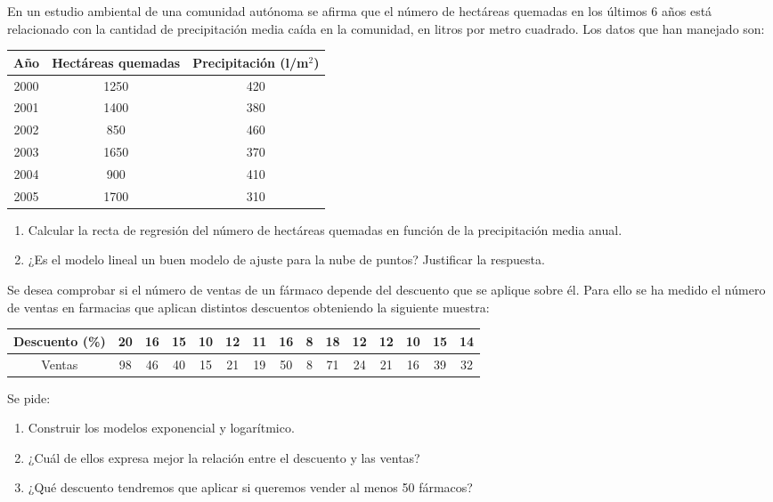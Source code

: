 {En un estudio ambiental de una comunidad autónoma se afirma que el número de hectáreas quemadas en los últimos 6 años está relacionado con la cantidad de precipitación media caída en la comunidad, en litros por metro cuadrado. Los datos que han manejado son:
\begin{center}
\begin{tabular}{|l|l|l|}
\hline
\multicolumn{1}{|c|}{Año} & \multicolumn{1}{c|}{Hectáreas quemadas} & \multicolumn{1}{c|}{Precipitación (l/m$^2$)} \\
\hline
\multicolumn{1}{|c|}{2000} & \multicolumn{1}{c|}{1250} & \multicolumn{1}{c|}{420} \\
\hline
\multicolumn{1}{|c|}{2001} & \multicolumn{1}{c|}{1400} & \multicolumn{1}{c|}{380} \\
\hline
\multicolumn{1}{|c|}{2002} & \multicolumn{1}{c|}{850} & \multicolumn{1}{c|}{460} \\
\hline
\multicolumn{1}{|c|}{2003} & \multicolumn{1}{c|}{1650} & \multicolumn{1}{c|}{370} \\
\hline
\multicolumn{1}{|c|}{2004} & \multicolumn{1}{c|}{900} & \multicolumn{1}{c|}{410} \\
\hline
\multicolumn{1}{|c|}{2005} & \multicolumn{1}{c|}{1700} & \multicolumn{1}{c|}{310} \\
\hline
\end{tabular}
\end{center}

\begin{enumerate}
\item Calcular la recta de regresión del número de hectáreas quemadas en función de la precipitación media anual.
\item ¿Es el modelo lineal un buen modelo de ajuste para la nube de puntos? Justificar la respuesta.
\end{enumerate}
}
{}
{}


{Se desea comprobar si el número de ventas de un fármaco depende del descuento que se aplique sobre él.
Para ello se ha medido el número de ventas en farmacias que aplican distintos descuentos obteniendo la siguiente muestra:
\begin{center}
\begin{tabular}{|c||c|c|c|c|c|c|c|c|c|c|c|c|c|c|}
\hline Descuento (\%) & 20 & 16 & 15 & 10 & 12 & 11 & 16 & 8 & 18 & 12 & 12 & 10 & 15 & 14 \\
\hline Ventas & 98 & 46 & 40 & 15 & 21 & 19 & 50 & 8 & 71 & 24 & 21 & 16 & 39 & 32 \\
\hline
\end{tabular}
\end{center}
Se pide:
\begin{enumerate}
\item Construir los modelos exponencial y logarítmico.
\item ¿Cuál de ellos expresa mejor la relación entre el descuento y las ventas?
\item ¿Qué descuento tendremos que aplicar si queremos vender al menos 50 fármacos?
\end{enumerate}
}
{}
{}


